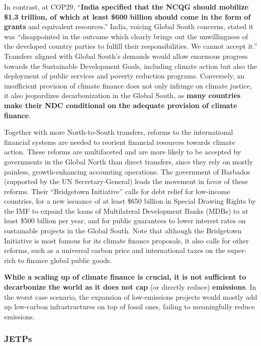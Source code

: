 \documentclass[12pt,english]{article}
\begin{document}
In contrast, at COP29, ``\textbf{India specified that the NCQG should mobilize \$1.3 trillion, of which at least \$600 billion should come in the form of grants} and equivalent resources.''\cite{earth_negotiations_bulletin_daily_2024} India, voicing Global South concerns, stated it was ``disappointed in the outcome which clearly brings out the unwillingness of the developed country parties to fulfill their responsibilities. We cannot accept it.'' Transfers aligned with Global South's demands would allow enormous progress towards the Sustainable Development Goals, including climate action but also the deployment of public services and poverty reduction programs. Conversely, an insufficient provision of climate finance does not only infringe on climate justice, it also jeopardizes decarbonization in the Global South, as \textbf{many countries make their NDC conditional on the adequate provision of climate finance}. 

Together with more North-to-South transfers, reforms to the international financial systems are needed to reorient financial resources towards climate action. These reforms are multifaceted and are more likely to be accepted by governments in the Global North than direct transfers, since they rely on mostly painless, growth-enhancing accounting operations. The government of Barbados (supported by the UN Secretary-General) leads the movement in favor of these reforms. Their ``Bridgetown Initiative'' calls for debt relief for low-income countries, for a new issuance of at least \$650 billion in Special Drawing Rights by the IMF to expand the loans of Multilateral Development Banks (MDBs) to at least \$500 billion per year, and for public guarantees to lower interest rates on sustainable projects in the Global South.\cite{bridgetown_bridgetown_2025} Note that although the Bridgetown Initiative is most famous for its climate finance proposals, it also calls for other reforms, such as a universal carbon price and international taxes on the super-rich to finance global public goods. 

\textbf{While a scaling up of climate finance is crucial, it is not sufficient to decarbonize the world as it does not cap} (or directly reduce) \textbf{emissions}. In the worst case scenario, the expansion of low-emissions projects would mostly add up low-carbon infrastructures on top of fossil ones, failing to meaningfully reduce emissions.

\subsubsection{JETPs\label{subsubsec:jetp}}
\end{document}

